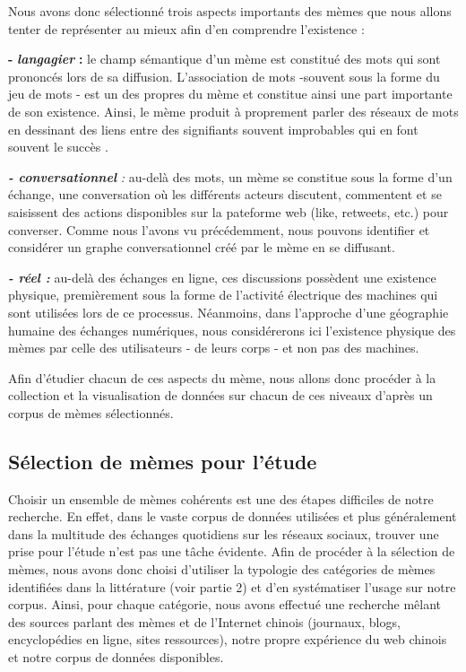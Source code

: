 Nous avons donc s\'electionn\'e trois aspects importants des m\`emes que
nous allons tenter de repr\'esenter au mieux afin d{\textquoteright}en
comprendre l{\textquoteright}existence :

\textbf{{}- }\textbf{\textit{langagier }}\textbf{:} le champ
s\'emantique d{\textquoteright}un m\`eme est constitu\'e des mots qui
sont prononc\'es lors de sa diffusion. L{\textquoteright}association de
mots -souvent sous la forme du jeu de mots - est un des propres du
m\`eme et constitue ainsi une part importante de son existence. Ainsi,
le m\`eme produit \`a proprement parler des r\'eseaux de mots en
dessinant des liens entre des signifiants souvent improbables qui en
font souvent le succ\`es \citep{Bauckhage2011}.

\textbf{\textit{{}- conversationnel }}\textit{: }au-del\`a des mots, un
m\`eme se constitue sous la forme d{\textquoteright}un \'echange, une
conversation o\`u les diff\'erents acteurs discutent, commentent et se
saisissent des actions disponibles sur la pateforme web (like,
retweets, etc.) pour converser. Comme nous l{\textquoteright}avons vu
pr\'ec\'edemment, nous pouvons identifier et consid\'erer un graphe
conversationnel cr\'e\'e par le m\`eme en se diffusant.

\textbf{\textit{{}- r\'eel : }}au-del\`a des \'echanges en ligne, ces
discussions poss\`edent une existence physique, premi\`erement sous la
forme de l{\textquoteright}activit\'e \'electrique des machines qui
sont utilis\'ees lors de ce processus. N\'eanmoins, dans
l{\textquoteright}approche d{\textquoteright}une g\'eographie humaine
des \'echanges num\'eriques, nous consid\'ererons ici
l{\textquoteright}existence physique des m\`emes par celle des
utilisateurs - de leurs corps - et non pas des machines.

Afin d{\textquoteright}\'etudier chacun de ces aspects du m\`eme, nous
allons donc proc\'eder \`a la collection et la visualisation de
donn\'ees sur chacun de ces niveaux d{\textquoteright}apr\`es un corpus
de m\`emes s\'electionn\'es.

\subsection[S\'election de m\`emes pour l{\textquoteright}\'etude]{\textmd{\textup{ S\'election de
m\`emes pour l{\textquoteright}\'etude}}}
Choisir un ensemble de m\`emes coh\'erents est une des \'etapes
difficiles de notre recherche. En effet, dans le vaste corpus de
donn\'ees utilis\'ees et plus g\'en\'eralement dans la multitude des
\'echanges quotidiens sur les r\'eseaux sociaux, trouver une prise pour
l{\textquoteright}\'etude n{\textquoteright}est pas une t\^ache
\'evidente. Afin de proc\'eder \`a la s\'election de m\`emes, nous
avons donc choisi d{\textquoteright}utiliser la typologie des
cat\'egories de m\`emes identifi\'ees dans la litt\'erature (voir
partie 2) et d{\textquoteright}en syst\'ematiser
l{\textquoteright}usage sur notre corpus. Ainsi, pour chaque
cat\'egorie, nous avons effectu\'e une recherche m\^elant des sources
parlant des m\`emes et de l{\textquoteright}Internet chinois (journaux,
blogs, encyclop\'edies en ligne, sites ressources), notre propre
exp\'erience du web chinois et notre corpus de donn\'ees disponibles.

